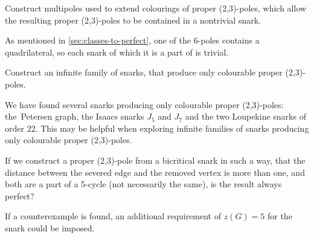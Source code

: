 \begin{problem}
	Construct multipoles used to extend colourings of proper (2,3)-poles, which allow the resulting proper (2,3)-poles to be contained in a nontrivial snark.
\end{problem}

As mentioned in \cref{sec:classes-to-perfect}, one of the 6-poles contains a quadrilateral, so each snark of which it is a part of is trivial.

\begin{problem}
	Construct an infinite family of snarks, that produce only colourable proper (2,3)-poles.
\end{problem}

We have found several snarks producing only colourable proper (2,3)-poles: the~Petersen graph, the Isaacs snarks $J_5$ and $J_7$ and the two Loupekine snarks of order 22. This may be helpful when exploring infinite families of snarks producing only colourable proper (2,3)-poles.

\begin{problem}
	If we construct a proper (2,3)-pole from a bicritical snark in such a way, that the distance between the severed edge and the removed vertex is more than one, and both are a part of a 5-cycle (not necessarily the same), is the result always perfect?
\end{problem}

If a counterexample is found, an additional requirement of $z(G)=5$ for the snark could be imposed.
